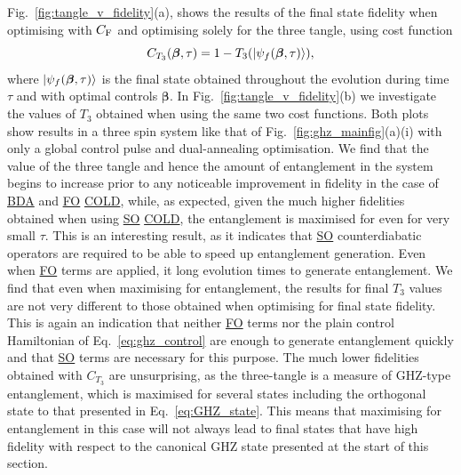 \documentclass[a4paper,oneside,11pt]{book}
\newcommand{\betabb}{\boldsymbol{\beta}}
\newcommand{\acrref}[1]{\hyperref[acr:#1]{#1}}
\begin{document}
Fig.~\ref{fig:tangle_v_fidelity}(a), shows the results of the final state fidelity when optimising with $C_{\rm F}$ and optimising solely for the three tangle, using cost function
\begin{equation}\label{eq:tangle_costfunc}
    C_{T_3}(\betabb, \tau) = 1 - T_3(\ket{\psi_f(\betabb, \tau)}),
\end{equation}
where $\ket{\psi_f(\betabb, \tau)}$ is the final state obtained throughout the evolution during time $\tau$ and with optimal controls $\betabb$. In Fig.~\ref{fig:tangle_v_fidelity}(b) we investigate the values of $T_3$ obtained when using the same two cost functions. Both plots show results in a three spin system like that of Fig.~\ref{fig:ghz_mainfig}(a)(i) with only a global control pulse and dual-annealing optimisation. We find that the value of the three tangle and hence the amount of entanglement in the system begins to increase prior to any noticeable improvement in fidelity in the case of \acrref{BDA} and \acrref{FO} \acrref{COLD}, while, as expected, given the much higher fidelities obtained when using \acrref{SO} \acrref{COLD}, the entanglement is maximised for even for very small $\tau$. This is an interesting result, as it indicates that \acrref{SO} counterdiabatic operators are required to be able to speed up entanglement generation. Even when \acrref{FO} terms are applied, it long evolution times to generate entanglement. We find that even when maximising for entanglement, the results for final $T_3$ values are not very different to those obtained when optimising for final state fidelity. This is again an indication that neither \acrref{FO} terms nor the plain control Hamiltonian of Eq.~\eqref{eq:ghz_control} are enough to generate entanglement quickly and that \acrref{SO} terms are necessary for this purpose. The much lower fidelities obtained with $C_{T_3}$ are unsurprising, as the three-tangle is a measure of GHZ-type entanglement, which is maximised for several states including the orthogonal state to that presented in Eq.~\eqref{eq:GHZ_state}. This means that maximising for entanglement in this case will not always lead to final states that have high fidelity with respect to the canonical GHZ state presented at the start of this section.
\end{document}
